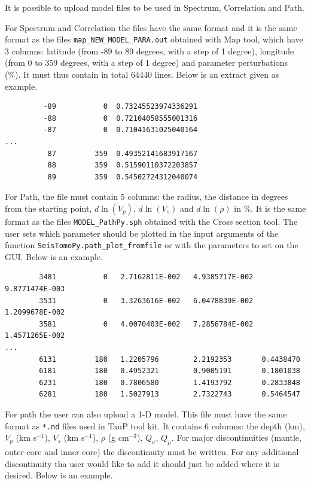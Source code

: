 \documentclass[12pt]{article}
\begin{document}
It is possible to upload model files to be used in Spectrum, Correlation and Path. 

For Spectrum and Correlation the files have the same format and it is the same format as the files
    \verb?map_NEW_MODEL_PARA.out? obtained with Map tool, which have 3 columns:
    latitude (from -89 to 89 degrees, with a step of 1 degree),
    longitude (from 0 to 359 degrees, with a step of 1 degree) and
    parameter perturbations (\%). It must thus contain in total 64440 lines. Below is an extract given as example.

\begin{verbatim}
         -89           0  0.73245523974336291     
         -88           0  0.72104058555001316     
         -87           0  0.71041631025040164     
... 
          87         359  0.49352141683917167     
          88         359  0.51590110372203857     
          89         359  0.54502724312040074    
\end{verbatim}

For Path, the file must contain 5 columns: the radius, the distance in degrees from the starting point, $d\ln(V_p)$, $d\ln(V_s)$ and $d\ln(\rho)$ in \%. It is the same format as the files  \verb?MODEL_PathPy.sph? obtained with the Cross section tool. The user sets which parameter should be plotted in the input arguments of the function \verb?SeisTomoPy.path_plot_fromfile? or with the parameters to set on the GUI. Below is an example.

\begin{verbatim}
        3481           0   2.7162811E-002   4.9385717E-002   9.8771474E-003
        3531           0   3.3263616E-002   6.0478839E-002   1.2099678E-002
        3581           0   4.0070403E-002   7.2856784E-002   1.4571265E-002
...
        6131         180   1.2205796        2.2192353       0.4438470     
        6181         180   0.4952321        0.9005191       0.1801038     
        6231         180   0.7806580        1.4193792       0.2833848     
        6281         180   1.5027913        2.7322743       0.5464547     
\end{verbatim}

For path the user can also upload a 1-D model. This file must have the same format as \verb?*.nd? files used in TauP tool kit. It contains 6 columns: the depth (km), $V_p$ (km s$^{-1}$), $V_s$ (km s$^{-1}$),  $\rho$ (g cm$^{-3}$), $Q_\kappa$, $Q_\mu$. For major discontinuities (mantle, outer-core and inner-core) the discontinuity must be written. For any additional discontinuity tha user would like to add it should just be added where it is desired. Below is an example.
\end{document}
